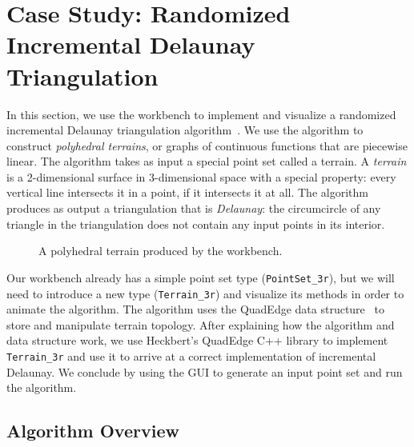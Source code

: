 
\FloatBarrier
\section{Case Study: Randomized Incremental Delaunay Triangulation}
\label{sec:case-delaunay}

In this section, we use the workbench to implement and visualize a randomized
incremental Delaunay triangulation algorithm~\cite{lischinski1994incremental}.
We use the algorithm to construct \emph{polyhedral terrains}, or graphs of
continuous functions that are piecewise linear. The algorithm takes as input a
special point set called a terrain. A \emph{terrain} is a 2-dimensional surface
in 3-dimensional space with a special property: every vertical line intersects
it in a point, if it intersects it at all. The algorithm produces as output a
triangulation that is \emph{Delaunay}: the circumcircle of any triangle in the
triangulation does not contain any input points in its interior. 

\begin{figure}[htb]
\centering
{} 
\caption{A polyhedral terrain produced by the workbench.}
\label{fig:terrain-intro} 
\end{figure}

Our workbench already has a simple point set type
(\texttt{PointSet\_3r}), but we will need to introduce a new type 
(\texttt{Terrain\_3r}) and visualize its methods in order to animate the
algorithm. The algorithm uses the QuadEdge data
structure~\cite{guibas1985primitives} to store and manipulate terrain topology.
After explaining how the algorithm and data structure work, we use Heckbert's
QuadEdge C++ library to implement \texttt{Terrain\_3r} and use it to arrive at a
correct implementation of incremental Delaunay. We conclude by using the GUI to
generate an input point set and run the algorithm.


\subsection{Algorithm Overview}

